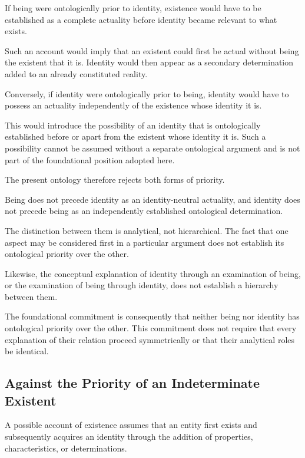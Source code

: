 If being were ontologically prior to identity,
existence would have to be established as
a complete actuality before identity became
relevant to what exists.

Such an account would imply that an existent
could first be actual without being the
existent that it is. Identity would then
appear as a secondary determination added
to an already constituted reality.

Conversely, if identity were ontologically
prior to being, identity would have to possess
an actuality independently of the existence
whose identity it is.

This would introduce the possibility of an
identity that is ontologically established
before or apart from the existent whose
identity it is. Such a possibility cannot
be assumed without a separate ontological
argument and is not part of the foundational
position adopted here.

The present ontology therefore rejects
both forms of priority.

Being does not precede identity as an
identity-neutral actuality, and identity
does not precede being as an independently
established ontological determination.

The distinction between them is analytical,
not hierarchical. The fact that one aspect
may be considered first in a particular
argument does not establish its ontological
priority over the other.

Likewise, the conceptual explanation of
identity through an examination of being,
or the examination of being through identity,
does not establish a hierarchy between them.

The foundational commitment is consequently
that neither being nor identity has ontological
priority over the other. This commitment
does not require that every explanation
of their relation proceed symmetrically
or that their analytical roles be identical.



\subsection{Against the Priority of an Indeterminate Existent}

A possible account of existence assumes
that an entity first exists and subsequently
acquires an identity through the addition
of properties, characteristics, or
determinations.

